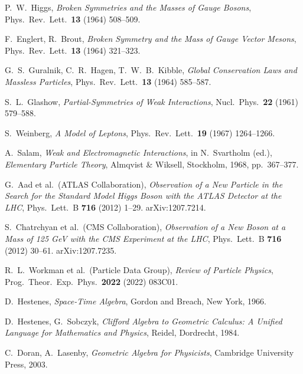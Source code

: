 \documentclass[11pt,a4paper]{article}
\theoremstyle{definition}
\theoremstyle{plain}
\theoremstyle{remark}
\begin{document}
\vspace{1em}

\begin{thebibliography}{99}\setlength{\itemsep}{3pt}

P.~W.~Higgs, \emph{Broken Symmetries and the Masses of Gauge Bosons}, Phys.\ Rev.\ Lett.\ \textbf{13} (1964) 508--509.

F.~Englert, R.~Brout, \emph{Broken Symmetry and the Mass of Gauge Vector Mesons}, Phys.\ Rev.\ Lett.\ \textbf{13} (1964) 321--323.

G.~S.~Guralnik, C.~R.~Hagen, T.~W.~B.~Kibble, \emph{Global Conservation Laws and Massless Particles}, Phys.\ Rev.\ Lett.\ \textbf{13} (1964) 585--587.

S.~L.~Glashow, \emph{Partial-Symmetries of Weak Interactions}, Nucl.\ Phys.\ \textbf{22} (1961) 579--588.

S.~Weinberg, \emph{A Model of Leptons}, Phys.\ Rev.\ Lett.\ \textbf{19} (1967) 1264--1266.

A.~Salam, \emph{Weak and Electromagnetic Interactions}, in N.~Svartholm (ed.), \textit{Elementary Particle Theory}, Almqvist \& Wiksell, Stockholm, 1968, pp.~367--377.

G.~Aad et al.\ (ATLAS Collaboration), \emph{Observation of a New Particle in the Search for the Standard Model Higgs Boson with the ATLAS Detector at the LHC}, Phys.\ Lett.\ B \textbf{716} (2012) 1--29. arXiv:1207.7214.

S.~Chatrchyan et al.\ (CMS Collaboration), \emph{Observation of a New Boson at a Mass of 125 GeV with the CMS Experiment at the LHC}, Phys.\ Lett.\ B \textbf{716} (2012) 30--61. arXiv:1207.7235.

R.~L.~Workman et al.\ (Particle Data Group), \emph{Review of Particle Physics}, Prog.\ Theor.\ Exp.\ Phys.\ \textbf{2022} (2022) 083C01.

D.~Hestenes, \emph{Space-Time Algebra}, Gordon and Breach, New York, 1966.

D.~Hestenes, G.~Sobczyk, \emph{Clifford Algebra to Geometric Calculus: A Unified Language for Mathematics and Physics}, Reidel, Dordrecht, 1984.

C.~Doran, A.~Lasenby, \emph{Geometric Algebra for Physicists}, Cambridge University Press, 2003.


\end{thebibliography}
\end{document}
